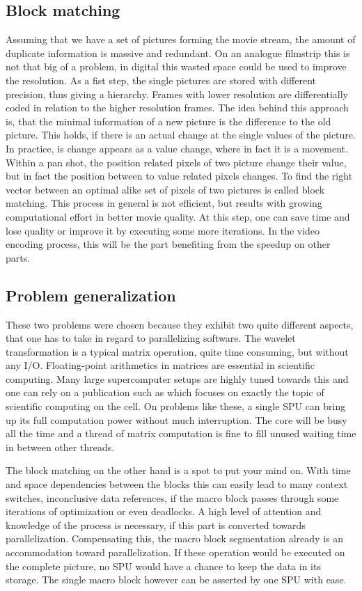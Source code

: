\subsection{Block matching}
\label{subsec:bm}
Assuming that we have a set of pictures forming the movie stream, the amount of duplicate information is massive and redundant. On an analogue filmstrip this is not that big of a problem, in digital this wasted space could be used to improve the resolution.
As a fist step, the single pictures are stored with different precision, thus giving a hierarchy. Frames with lower resolution are differentially coded in relation to the higher resolution frames.
The idea behind this approach is, that the minimal information of a new picture is the difference to the old picture. This holds, if there is an actual change at the single values of the picture.
In practice, is change appears as a value change, where in fact it is a movement. Within a pan shot, the position related pixels of two picture change their value, but in fact the position between to value related pixels changes.
To find the right vector between an optimal alike set of pixels of two pictures is called block matching. This process in general is not efficient, but results with growing computational effort in better movie quality. At this step, one can save time and lose quality or improve it by executing some more iterations. In the video encoding process, this will be the part benefiting from the speedup on other parts.

\subsection{Problem generalization}
These two problems were chosen because they exhibit two quite different aspects, that one has to take in regard to parallelizing software.
The wavelet transformation is a typical matrix operation, quite time consuming, but without any I/O. Floating-point arithmetics in matrices are essential in scientific computing. Many large supercomputer setups are highly tuned towards this and one can rely on a publication such as \cite{CF06} which focuses on exactly the topic of scientific computing on the cell. On problems like these, a single SPU can bring up its full computation power without much interruption. The core will be busy all the time and a thread of matrix computation is fine to fill unused waiting time in between other threads.

The block matching on the other hand is a spot to put your mind on. With time and space dependencies between the blocks this can easily lead to many context switches, inconclusive data references, if the macro block passes through some iterations of optimization or even deadlocks. A high level of attention and knowledge of the process is necessary, if this part is converted towards parallelization. Compensating this, the macro block segmentation already is an accommodation toward parallelization. If these operation would be executed on the complete picture, no SPU would have a chance to keep the data in its storage. The single macro block however can be asserted by one SPU with ease.

